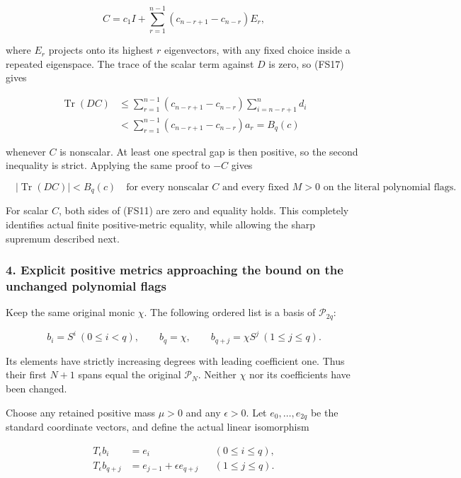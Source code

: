 \[
C=c_1I+\sum_{r=1}^{n-1}(c_{n-r+1}-c_{n-r})E_r,
\]

where \(E_r\) projects onto its highest \(r\) eigenvectors, with any fixed choice inside a repeated eigenspace. The trace of the scalar term against \(D\) is zero, so (FS17) gives

\[
\begin{aligned}
\operatorname{Tr}(DC)
&\le\sum_{r=1}^{n-1}(c_{n-r+1}-c_{n-r})
       \sum_{i=n-r+1}^n d_i\\
&<\sum_{r=1}^{n-1}(c_{n-r+1}-c_{n-r})a_r
=B_q(c)
\end{aligned}
\tag{FS18}
\]

whenever \(C\) is nonscalar. At least one spectral gap is then positive, so the second inequality is strict. Applying the same proof to \(-C\) gives

\[
\boxed{\quad |\operatorname{Tr}(DC)|<B_q(c)
\quad\text{for every nonscalar }C\text{ and every fixed }M>0
\text{ on the literal polynomial flags}.\quad}
\tag{FS19}
\]

For scalar \(C\), both sides of (FS11) are zero and equality holds. This completely identifies actual finite positive-metric equality, while allowing the sharp supremum described next.

\subsubsection{4. Explicit positive metrics approaching the bound on the unchanged polynomial flags}\label{endpoint-four_window_sharpness--explicit-positive-metrics-approaching-the-bound-on-the-unchanged-polynomial-flags}

Keep the same original monic \(\chi\). The following ordered list is a basis of \(\mathcal P_{2q}\):

\[
b_i=S^i\ (0\le i<q),\qquad
b_q=\chi,\qquad
b_{q+j}=\chi S^j\ (1\le j\le q).
\tag{FS20}
\]

Its elements have strictly increasing degrees with leading coefficient one. Thus their first \(N+1\) spans equal the original \(\mathcal P_N\). Neither \(\chi\) nor its coefficients have been changed.

Choose any retained positive mass \(\mu>0\) and any \(\epsilon>0\). Let \(e_0,\ldots,e_{2q}\) be the standard coordinate vectors, and define the actual linear isomorphism

\[
\begin{aligned}
T_\epsilon b_i&=e_i &&(0\le i\le q),\\
T_\epsilon b_{q+j}&=e_{j-1}+\epsilon e_{q+j}
&&(1\le j\le q).
\end{aligned}
\tag{FS21}
\]

